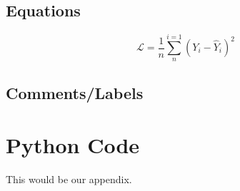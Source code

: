 \documentclass[a4paper]{scrartcl}
\theoremstyle{definition}
\begin{document}
\subsection{Equations}
\begin{equation}
	\mathcal{L} = \frac{1}{n}\sum_n^{i=1} (Y_i - \hat{Y}_i)^2
\end{equation}

\subsection{Comments/Labels}

\appendix
\section{Python Code}
This would be our appendix.

\end{document}
